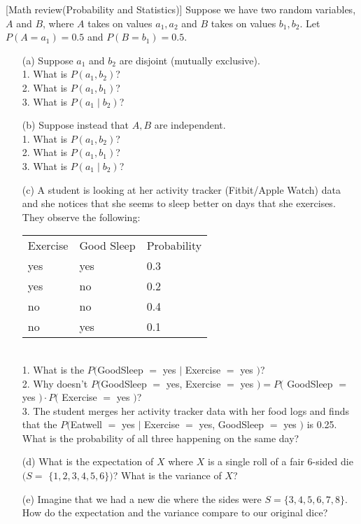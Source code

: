 \item {} [Math review(Probability and Statistics)]
Suppose we have two random variables, $A$ and $B$, where $A$ takes on values $a_1, a_2$ and $B$ takes on values $b_1, b_2$. Let $P\left(A=a_1\right)=0.5$ and $P\left(B=b_1\right)=0.5$.
\begin{itemize}
    \item[(a)] Suppose $a_1$ and $b_2$ are disjoint (mutually exclusive). ~ \\
    1. What is $P\left(a_1, b_2\right)$? \\
    2. What is $P\left(a_1, b_1\right)$? \\
    3. What is $P\left(a_1 \mid b_2\right)$?

    \item[(b)] Suppose instead that $A, B$ are independent. ~ \\
    1. What is $P\left(a_1, b_2\right)$? \\
    2. What is $P\left(a_1, b_1\right)$? \\
    3. What is $P\left(a_1 \mid b_2\right)$?
    \item[(c)] A student is looking at her activity tracker (Fitbit/Apple Watch) data and she notices that she seems to sleep better on days that she exercises. They observe the following: \\
    \begin{tabular}{lll}
    Exercise & Good Sleep & Probability \\
    yes & yes & 0.3 \\
    yes & no & 0.2 \\
    no & no & 0.4 \\
    no & yes & 0.1
    \end{tabular} \\
    1. What is the $P($GoodSleep $=$ yes $|$ Exercise $=$ yes $)$? \\
    2. Why doesn't $P($GoodSleep $=$ yes, Exercise $=$ yes $)=P($ GoodSleep $=$ yes $)\cdot P($ Exercise $=$ yes $)$? \\
    3. The student merges her activity tracker data with her food logs and finds that the $P($Eatwell $=$ yes $|$ Exercise $=$ yes, GoodSleep $=$ yes $)$ is 0.25. What is the probability of all three happening on the same day? ~

    \item[(d)] What is the expectation of $X$ where $X$ is a single roll of a fair 6-sided die $(S=$ $\{1,2,3,4,5,6\})$? What is the variance of $X$? ~

    \item[(e)] Imagine that we had a new die where the sides were $S=\{3,4,5,6,7,8\}$. How do the expectation and the variance compare to our original dice? ~
\end{itemize}

\solution






\newpage